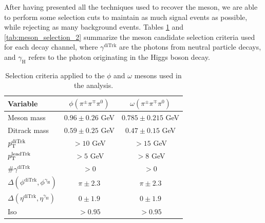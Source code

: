 After having presented all the techniques used to recover the meson, we are able to perform some selection cuts to maintain as much signal events as possible, while rejecting as many background events. Tables \ref{tab:meson_selection_1} and \ref{tab:meson_selection_2} summarize the meson candidate selection criteria used for each decay channel, where $\gamma^{\text{diTrk}}$ are the photons from neutral particle decays, and $\gamma_\text{H}$ refers to the photon originating in the Higgs boson decay.
\begin{table}[!ht]
    \centering
    \begin{tabular}{|l|c|c|}
        \hline
        \cellcolor{lightgray}Variable & \cellcolor{lightgray}$\phi(\pi^{\pm}\pi^{\mp}\pi^{0})$ & \cellcolor{lightgray}$\omega(\pi^{\pm}\pi^{\mp}\pi^{0})$ \\ \hline
        Meson mass                                              &$0.96\pm0.26$ GeV  &$0.785\pm0.215$ GeV    \\
        Ditrack mass                                            &$0.59\pm0.25$ GeV  &$0.47\pm0.15$ GeV      \\
        $p_\text{T}^{\text{diTrk}}$                                    &$>10$ GeV          &$>15$ GeV              \\
        $p_\text{T}^{\text{leadTrk}}$                                  &$>5$ GeV           &$>8$ GeV               \\
        $\#\gamma^{\text{diTrk}}$                               &$>0$               &$>0$                   \\
        $\Delta(\phi^{\text{diTrk}}, \phi^{\gamma_\text{H}})$   &$\pi\pm2.3$    &$\pi\pm2.3$        \\
        $\Delta(\eta^{\text{diTrk}}, \eta^{\gamma_\text{H}})$   &$0\pm1.9$          &$0\pm1.9$              \\
        Iso                                                     &$>0.95$            &$>0.95$                \\
        \hline
        \end{tabular}
    \caption{Selection criteria applied to the $\phi$ and $\omega$ mesons used in the analysis.}
    \label{tab:meson_selection_1}
\end{table}


